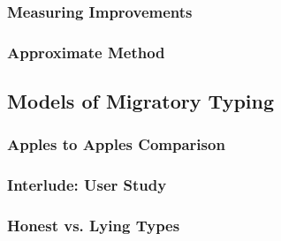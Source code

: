 \subsubsection{Measuring Improvements}




\subsubsection{Approximate Method}


\subsection{Models of Migratory Typing}


\subsubsection{Apples to Apples Comparison}

\subsubsection{Interlude: User Study}


\subsubsection{Honest vs. Lying Types}

